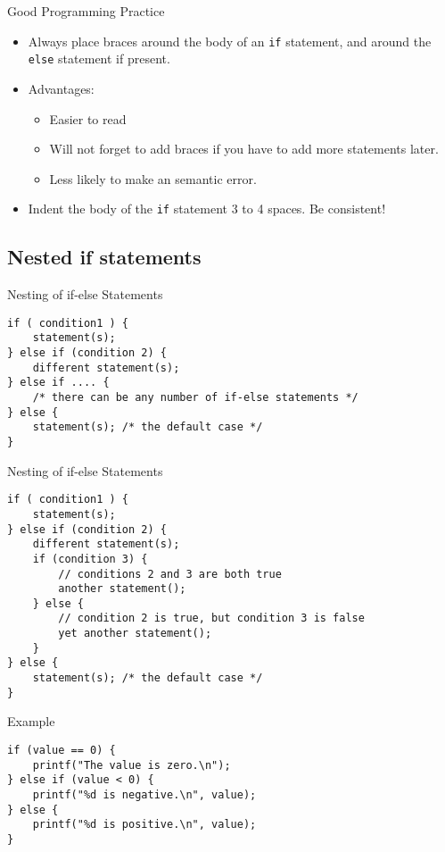 \documentclass[graphics]{beamer}
\begin{document}
\begin{frame}{Good Programming Practice}
    \begin{itemize}
        \item Always place braces around the body of an \texttt{if} statement, and around the \texttt{else} statement if present.
        \item Advantages:
        \begin{itemize}
            \item Easier to read
            \item Will not forget to add braces if you have to add more statements later.
            \item Less likely to make an semantic error.
        \end{itemize}
        \item Indent the body of the \texttt{if} statement 3 to 4 spaces. Be consistent!
    \end{itemize}
\end{frame}

\subsection{Nested if statements}
\begin{frame}[fragile]{Nesting of if-else Statements}
\begin{verbatim}
if ( condition1 ) {
    statement(s);
} else if (condition 2) {
    different statement(s);
} else if .... {
    /* there can be any number of if-else statements */
} else {
    statement(s); /* the default case */
}
\end{verbatim}
\end{frame}

\begin{frame}[fragile]{Nesting of if-else Statements}
\begin{verbatim}
if ( condition1 ) {
    statement(s);
} else if (condition 2) {
    different statement(s);
    if (condition 3) {
        // conditions 2 and 3 are both true
        another statement();
    } else {
        // condition 2 is true, but condition 3 is false
        yet another statement();
    }
} else {
    statement(s); /* the default case */
}
\end{verbatim}
\end{frame}

\begin{frame}[fragile]{Example}
\begin{verbatim}
if (value == 0) {
    printf("The value is zero.\n");
} else if (value < 0) {
    printf("%d is negative.\n", value);
} else {
    printf("%d is positive.\n", value);
}
\end{verbatim}
\end{frame}
\end{document}
